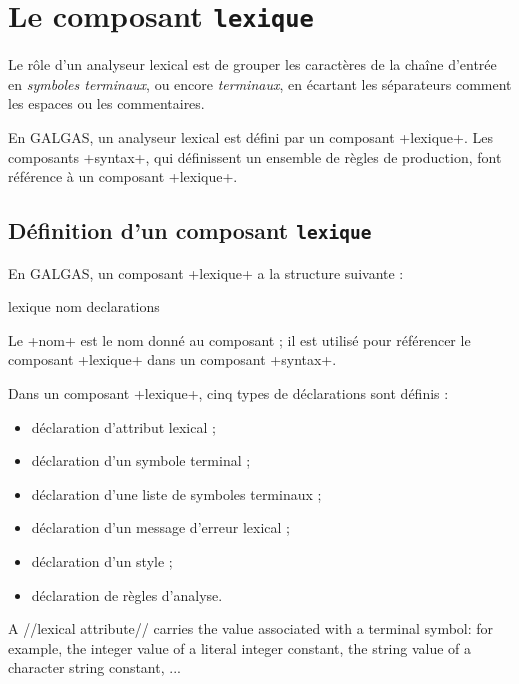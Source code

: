 
\chapter{Le composant \texttt{lexique}}

Le rôle d'un analyseur lexical est de grouper les caractères de la chaîne d'entrée en \emph{symboles terminaux}, ou encore \emph{terminaux}, en écartant les séparateurs comment les espaces ou les commentaires. 

En GALGAS, un analyseur lexical est défini par un composant \ggs+lexique+. Les composants \ggs+syntax+, qui définissent un ensemble de règles de production, font référence à un composant \ggs+lexique+.









\section{Définition d'un composant \texttt{lexique}}


En GALGAS, un composant \ggs+lexique+ a la structure suivante :

\begin{galgas}
lexique nom {
  declarations
}
\end{galgas}

Le \ggs+nom+ est le nom donné au composant ; il est utilisé pour référencer le composant \ggs+lexique+ dans un composant \ggs+syntax+.


Dans un composant \ggs+lexique+, cinq types de déclarations sont définis :
\begin{itemize}
  \item déclaration d'attribut lexical ;
  \item déclaration d'un symbole terminal ;
  \item déclaration d'une liste de symboles terminaux ;
  \item déclaration d'un message d'erreur lexical ;
  \item déclaration d'un style ;
  \item déclaration de règles d'analyse.
\end{itemize}

A //lexical attribute// carries the value associated with a terminal symbol: for example, the integer value of a literal integer constant, the string value of a character string constant, ...


